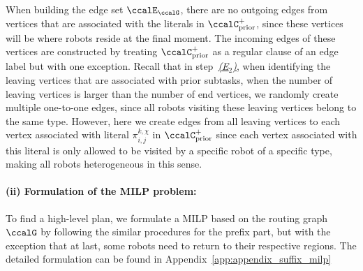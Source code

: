 \documentclass[Afour,sageh,times]{sagej}
\newcounter{mycounter}
\renewcommand{\ap}[3]{\mathcal{\pi}_{{#1},{#2}}^{#3}}
\begin{document}
{{  When  building the edge set $\ccalE_\ccalG$, there are no outgoing edges from  vertices that are associated with the literals in $\ccalC_{\text{prior}}^+$, since these vertices will be where robots reside at the final moment. The incoming edges of these vertices are constructed by treating $\ccalC_{\text{prior}}^+$ as a regular clause  of an edge label but with one exception.  Recall that in step~\hyperref[sec:a]{\it {(E$_2$)}}, when identifying the leaving vertices that are associated with prior subtasks,  when the number of leaving vertices is larger than the number of end vertices, we randomly create multiple  one-to-one edges, since all robots visiting these leaving vertices belong to the same type. However, here we create edges from all leaving vertices to each vertex associated with literal $\ap{i}{j}{k,\chi}$ in $\ccalC_{\text{prior}}^+$ since each vertex associated with this literal  is only allowed to be visited by a specific robot of a specific type, making all robots heterogeneous in this sense.
\paragraph{(ii) Formulation of the MILP problem:}  To find a high-level plan, we formulate a MILP  based on the routing graph $\ccalG$
by following the similar procedures for the prefix part, but with the exception that at last, some robots need to return to their respective regions. The detailed formulation can be found in Appendix~\ref{app:appendix_suffix_milp}
}}
\end{document}

